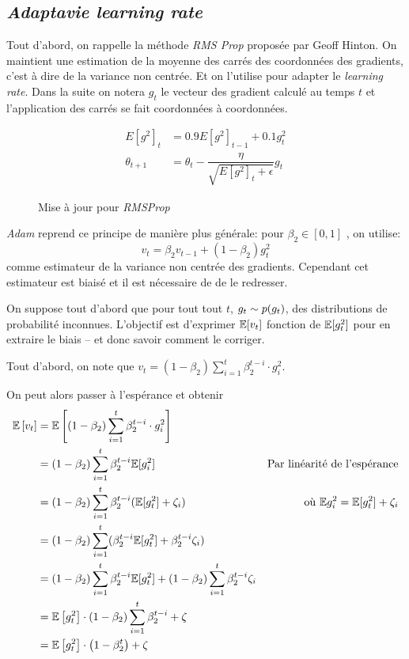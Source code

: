 \documentclass[fleqn,11pt, titlepage, french]{article}
\begin{document}
	\subsection{\emph{Adaptavie learning rate}}
	
	Tout d'abord, on rappelle la méthode \emph{RMS Prop} proposée par Geoff Hinton\cite{rmsprop}. On maintient une estimation de la moyenne des carrés des coordonnées des gradients, c'est à dire de la variance non centrée. Et on l'utilise pour adapter le \emph{learning rate}. Dans la suite on notera $g_t$ le vecteur des gradient calculé au temps $t$ et l'application des carrés se fait coordonnées à coordonnées.
	
	\begin{figure}[H]
		\centering
		\begin{align*}
			E[g^2]_t &= 0.9 E[g^2]_{t-1} + 0.1 g^2_t \\ 
			\theta_{t+1} &= \theta_{t} - \dfrac{\eta}{\sqrt{E[g^2]_t + \epsilon}} g_{t} 
		\end{align*}
		\caption{Mise à jour pour \emph{RMSProp}}
	\end{figure}

	\emph{Adam} reprend ce principe de manière plus générale: pour $\beta_2 \in [0,1]$ , on utilise: \[v_t = \beta_2 v_{t-1} +  (1-\beta_2)g_t^2\] comme estimateur de la variance non centrée des gradients. Cependant cet estimateur est biaisé et il est nécessaire de de le redresser.
	
	On suppose tout d'abord que pour tout tout $t$, $g_t \sim p(g_t)$, des distributions de probabilité inconnues. L'objectif est d'exprimer $\mathbb{E}[v_t]$ fonction de $\mathbb{E}[g_t^2]$ pour en extraire le biais -- et donc savoir comment le corriger.
	
	Tout d'abord, on note que $v_{t}=\left(1-\beta_{2}\right) \sum_{i=1}^{t} \beta_{2}^{t-i} \cdot g_{i}^{2}$.
	
	On peut alors passer à l'espérance et obtenir
	\begin{align*} 
		\mathbb{E}\left[v_{t}\right] &=\mathbb{E}\left[\left(1-\beta_{2}\right) \sum_{i=1}^{t} \beta_{2}^{t-i} \cdot g_{i}^{2}\right] \\ 
		&=\left(1-\beta_{2}\right) \sum_{i=1}^{t} \beta_{2}^{t-i}  \mathbb{E} [g_{i}^{2}] &\text{Par linéarité de l'espérance} \\ 
		&=\left(1-\beta_{2}\right) \sum_{i=1}^{t} \beta_{2}^{t-i}  (\mathbb{E} [g_{t}^{2}] + \zeta_i)  		&\text{où $\mathbb{E} g_{i}^{2} = \mathbb{E}[g_{t}^{2}] + \zeta_i$} \\
		&=\left(1-\beta_{2}\right) \sum_{i=1}^{t} (\beta_{2}^{t-i}  \mathbb{E} [g_{t}^{2}] + \beta_{2}^{t-i} \zeta_i) \\
		&=\left(1-\beta_{2}\right) \sum_{i=1}^{t} \beta_{2}^{t-i}  \mathbb{E} [g_{t}^{2}] + \left(1-\beta_{2}\right) \sum_{i=1}^{t} \beta_{2}^{t-i} \zeta_i \\
		&=\mathbb{E}\left[g_{t}^{2}\right] \cdot\left(1-\beta_{2}\right) \sum_{i=1}^{t} \beta_{2}^{t-i}+\zeta \\ 
		&=\mathbb{E}\left[g_{t}^{2}\right] \cdot\left(1-\beta_{2}^{t}\right)+\zeta
	\end{align*}
	
\end{document}
